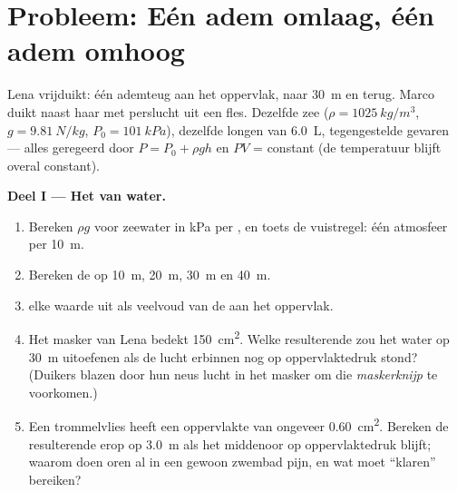 \section{Probleem: Eén adem omlaag, één adem omhoog}

\begin{problem}
\label{pb:g10:pressure:1}
Lena vrijduikt: één ademteug aan het oppervlak, naar \qty{30}{m} en
terug. Marco duikt naast haar met perslucht uit een fles. Dezelfde zee
($\rho = \qty{1025}{kg/m^3}$, $g = \qty{9.81}{N/kg}$,
$P_0 = \qty{101}{kPa}$), dezelfde longen van \qty{6.0}{L},
tegengestelde gevaren --- alles geregeerd door $P = P_0 + \rho g h$ en
$PV$ = constant (de temperatuur blijft overal constant).

\medskip
\noindent\textbf{Deel I --- Het  van water.}
\begin{enumerate}
  \item Bereken $\rho g$ voor zeewater in \unit{kPa} per , en toets
        de vuistregel: één atmosfeer per \qty{10}{m}.
  \item Bereken de  op \qty{10}{m}, \qty{20}{m},
        \qty{30}{m} en \qty{40}{m}.
  \item {} elke waarde uit als veelvoud van de  aan het oppervlak.
  \item Het masker van Lena bedekt \qty{150}{cm^2}. Welke resulterende
         zou het water op \qty{30}{m} uitoefenen als de lucht
        erbinnen nog op oppervlaktedruk stond? (Duikers blazen door hun
        neus lucht in het masker om die \emph{maskerknijp} te
        voorkomen.)
  \item Een trommelvlies heeft een oppervlakte van ongeveer
        \qty{0.60}{cm^2}. Bereken de resulterende  erop op
        \qty{3.0}{m} als het middenoor op oppervlaktedruk blijft; waarom
        doen oren al in een gewoon zwembad pijn, en wat moet
        ``klaren'' bereiken?
\end{enumerate}


\end{problem}
